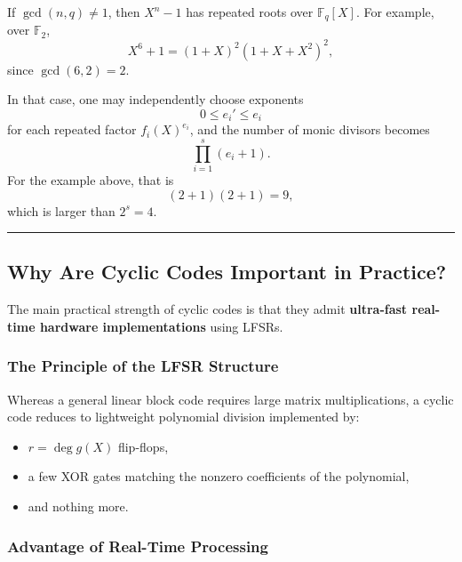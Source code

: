 \documentclass[
]{article}
\providecommand{\tightlist}{%
  \setlength{\itemsep}{0pt}\setlength{\parskip}{0pt}}
\begin{document}
If \(\gcd(n,q) \neq 1\), then \(X^n-1\) has repeated roots over
\(\mathbb{F}_q[X]\). For example, over \(\mathbb{F}_2\),
\[X^6+1=(1+X)^2(1+X+X^2)^2,\] since \(\gcd(6,2)=2\).

In that case, one may independently choose exponents
\[0 \le e_i' \le e_i\] for each repeated factor \(f_i(X)^{e_i}\), and
the number of monic divisors becomes \[\prod_{i=1}^s (e_i+1).\] For the
example above, that is \[(2+1)(2+1)=9,\] which is larger than \(2^s=4\).

\begin{center}\rule{0.5\linewidth}{0.5pt}\end{center}

\subsection{Why Are Cyclic Codes Important in
Practice?}\label{why-are-cyclic-codes-important-in-practice}

The main practical strength of cyclic codes is that they admit
\textbf{ultra-fast real-time hardware implementations} using LFSRs.

\subsubsection{The Principle of the LFSR
Structure}\label{principle-of-the-lfsr-structure}

Whereas a general linear block code requires large matrix
multiplications, a cyclic code reduces to lightweight polynomial
division implemented by:

\begin{itemize}
\tightlist
\item
  \(r=\deg g(X)\) flip-flops,
\item
  a few XOR gates matching the nonzero coefficients of the polynomial,
\item
  and nothing more.
\end{itemize}

\subsubsection{Advantage of Real-Time Processing}\label{advantage-of-real-time-processing}
\end{document}
